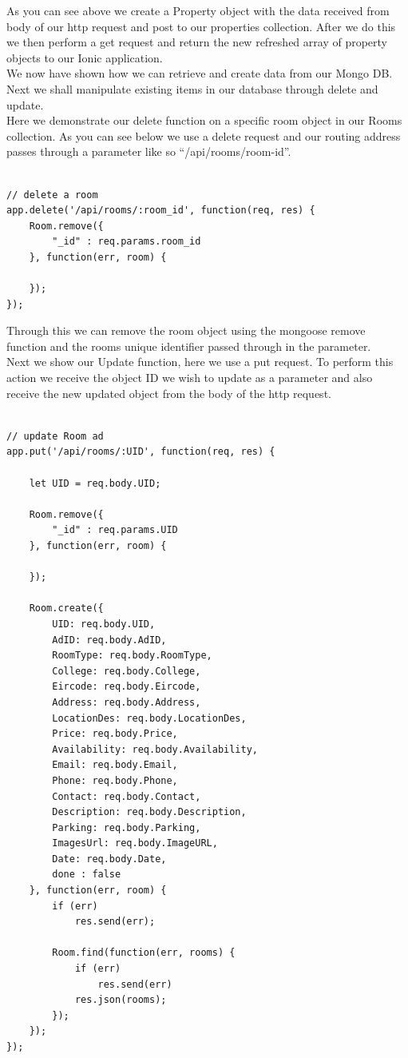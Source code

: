 As you can see above we create a Property object with the data received from body of our http request and post to our properties collection. After we do this we then perform a get request and return the new refreshed array of property objects to our Ionic application.\\


We now have shown how we can retrieve and create data from our Mongo DB. Next we shall manipulate existing items in our database through delete and update.\\


Here we demonstrate our delete function on a specific room object in our Rooms collection. As you can see below we use a delete request and our routing address passes through a parameter like so “/api/rooms/room-id”.\\


\begin{verbatim}

// delete a room
app.delete('/api/rooms/:room_id', function(req, res) {
	Room.remove({
		"_id" : req.params.room_id
	}, function(err, room) {

	});
});

\end{verbatim}


Through this we can remove the room object using the mongoose remove function and the rooms unique identifier passed through in the parameter.\\

Next we show our Update function, here we use a put request. To perform this action we receive the object ID we wish to update as a parameter and also receive the new updated object from the body of the http request.\\


\begin{verbatim}

// update Room ad
app.put('/api/rooms/:UID', function(req, res) {
	
	let UID = req.body.UID;
	
	Room.remove({
		"_id" : req.params.UID
	}, function(err, room) {

	});
	
	Room.create({
		UID: req.body.UID,
		AdID: req.body.AdID,
		RoomType: req.body.RoomType,
		College: req.body.College,
		Eircode: req.body.Eircode,
		Address: req.body.Address,
		LocationDes: req.body.LocationDes,
		Price: req.body.Price,
		Availability: req.body.Availability,
		Email: req.body.Email,
		Phone: req.body.Phone,
		Contact: req.body.Contact,
		Description: req.body.Description,
		Parking: req.body.Parking,
		ImagesUrl: req.body.ImageURL,
		Date: req.body.Date,
		done : false
	}, function(err, room) {
		if (err)
			res.send(err);

		Room.find(function(err, rooms) {
			if (err)
				res.send(err)
			res.json(rooms);
		});
	});
});

\end{verbatim}


